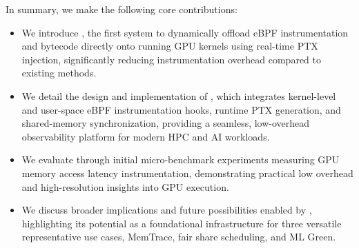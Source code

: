 In summary, we make the following core contributions:
\begin{itemize}[leftmargin=*,itemsep=0pt]
    \item We introduce \sys{}, the first system to dynamically offload eBPF instrumentation and bytecode directly onto running GPU kernels using real-time PTX injection, significantly reducing instrumentation overhead compared to existing methods.
    
    \item We detail the design and implementation of \sys{}, which integrates kernel-level and user-space eBPF instrumentation hooks, runtime PTX generation, and shared-memory synchronization, providing a seamless, low-overhead observability platform for modern HPC and AI workloads. 
    
    \item We evaluate \sys{} through initial micro-benchmark experiments measuring GPU memory access latency instrumentation, demonstrating practical low overhead and high-resolution insights into GPU execution. 
    
    \item We discuss broader implications and future possibilities enabled by \sys{}, highlighting its potential as a foundational infrastructure for three versatile representative use cases, MemTrace, fair share scheduling, and ML Green. 

\end{itemize}



